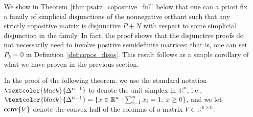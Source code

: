 \documentclass[12pt]{article}
\newcommand{\reals}{\mathbb{R}}
\newcommand{\tpose}{T}
\newcommand{\conv}{\operatornamewithlimits{conv}}
\newcommand{\mcS}{\mathcal{S}}
\newcommand{\mcC}{\mathcal{C}}
\newcommand{\mcN}{\mathcal{N}}
\newcommand{\mcV}{\mathcal{V}}
\newcommand{\mcPN}{\mathcal{PN}}
\theoremstyle{remark}
\begin{document}
We show in Theorem~\ref{thm:psatz_copositive_full} below that one can a priori fix a family of simplicial disjunctions of the nonnegative orthant such that any strictly copositive matrix is disjunctive $P+N$ with respect to some simplicial disjunction in the family. 
In fact, the proof shows that the disjunctive proofs do not necessarily need to involve positive semidefinite matrices; that is, one can set $P_k = 0$ in Definition~\ref{def:copos_disos}. This result follows as a simple corollary of what we have proven in the previous section.


In the proof of the following theorem, we use the standard notation~$\textcolor{black}{\Delta^{n-1}}$ to denote the unit simplex in~$\reals^n$, i.e., $\textcolor{black}{\Delta^{n-1}}=\{x\in\reals^n\mid \sum_{i=1}^n x_i=1,\; x\ge 0\}$, and we let $\conv\{V\}$ denote the convex hull of the columns of a matrix
$V\in\reals^{n\times n}$.



\end{document}
